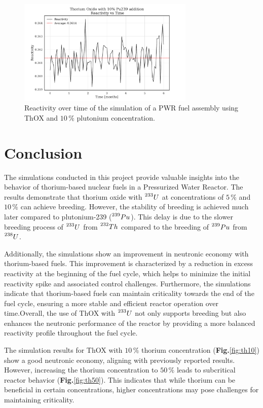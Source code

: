 \begin{figure}[ht]
    \centering
    \includegraphics[width=0.75\textwidth, scale = 0.5]{Kap7/Figures_Kap7/Reactivity_vs_Time_ThOX_Pu10.pdf}
    \caption{Reactivity over time of the simulation of a PWR fuel assembly using ThOX and \(10 \, \%\) plutonium concentration.}
    \label{fig:p_th_pu}
\end{figure}

\section{Conclusion}
The simulations conducted in this project provide valuable insights into the behavior of thorium-based nuclear fuels in a Pressurized Water Reactor. The results demonstrate that thorium oxide with \(\prescript{233}{}{U}\) at concentrations of \(5 \, \%\) and \(10 \, \%\) can achieve breeding. However, the stability of breeding is achieved much later compared to plutonium-239 (\(\prescript{239}{}{Pu}\)). This delay is due to the slower breeding process of \(\prescript{233}{}{U}\) from \(\prescript{232}{}{Th}\) compared to the breeding of \(\prescript{239}{}{Pu}\) from \(\prescript{238}{}{U}\).

Additionally, the simulations show an improvement in neutronic economy with thorium-based fuels. This improvement is characterized by a reduction in excess reactivity at the beginning of the fuel cycle, which helps to minimize the initial reactivity spike and associated control challenges. Furthermore, the simulations indicate that thorium-based fuels can maintain criticality towards the end of the fuel cycle, ensuring a more stable and efficient reactor operation over time.Overall, the use of ThOX with \(\prescript{233}{}{U}\) not only supports breeding but also enhances the neutronic performance of the reactor by providing a more balanced reactivity profile throughout the fuel cycle.

The simulation results for ThOX with \(10 \, \%\) thorium concentration (\textbf{Fig.}\ref{fig:th10}) show a good neutronic economy, aligning with previously reported results. However, increasing the thorium concentration to \(50 \, \%\) leads to subcritical reactor behavior (\textbf{Fig.}\ref{fig:th50}). This indicates that while thorium can be beneficial in certain concentrations, higher concentrations may pose challenges for maintaining criticality.

